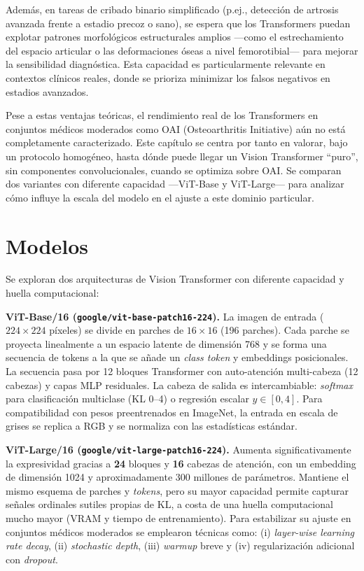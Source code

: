 \documentclass[11pt,spanish,listoffigures,listoftables]{tfgetsinf}
\begin{document}
Además, en tareas de cribado binario simplificado (p.ej., detección de artrosis avanzada frente a estadio precoz o sano), se espera que los Transformers puedan explotar patrones morfológicos estructurales amplios —como el estrechamiento del espacio articular o las deformaciones óseas a nivel femorotibial— para mejorar la sensibilidad diagnóstica. Esta capacidad es particularmente relevante en contextos clínicos reales, donde se prioriza minimizar los falsos negativos en estadios avanzados.

Pese a estas ventajas teóricas, el rendimiento real de los Transformers en conjuntos médicos moderados como OAI (Osteoarthritis Initiative) aún no está completamente caracterizado. Este capítulo se centra por tanto en valorar, bajo un protocolo homogéneo, hasta dónde puede llegar un Vision Transformer “puro”, sin componentes convolucionales, cuando se optimiza sobre OAI. Se comparan dos variantes con diferente capacidad —ViT-Base y ViT-Large— para analizar cómo influye la escala del modelo en el ajuste a este dominio particular.

\section{Modelos}
Se exploran dos arquitecturas de Vision Transformer con diferente capacidad y huella computacional:

\medskip
\noindent\textbf{ViT-Base/16 (\texttt{google/vit-base-patch16-224}).}
La imagen de entrada ($224{\times}224$ píxeles) se divide en parches de $16{\times}16$ (196 parches). Cada parche se proyecta linealmente a un espacio latente de dimensión 768 y se forma una secuencia de tokens a la que se añade un \emph{class token} y embeddings posicionales. La secuencia pasa por 12 bloques Transformer con auto-atención multi-cabeza (12 cabezas) y capas MLP residuales. La cabeza de salida es intercambiable: \emph{softmax} para clasificación multiclase (KL 0--4) o regresión escalar $\hat{y}\in[0,4]$.
Para compatibilidad con pesos preentrenados en ImageNet, la entrada en escala de grises se replica a RGB y se normaliza con las estadísticas estándar.

\medskip
\noindent\textbf{ViT-Large/16 (\texttt{google/vit-large-patch16-224}).}
Aumenta significativamente la expresividad gracias a \textbf{24} bloques y \textbf{16} cabezas de atención, con un embedding de dimensión 1024 y aproximadamente 300 millones de parámetros. Mantiene el mismo esquema de parches y \emph{tokens}, pero su mayor capacidad permite capturar señales ordinales sutiles propias de KL, a costa de una huella computacional mucho mayor (VRAM y tiempo de entrenamiento). Para estabilizar su ajuste en conjuntos médicos moderados se emplearon técnicas como: (i) \emph{layer-wise learning rate decay}, (ii) \emph{stochastic depth}, (iii) \emph{warmup} breve y (iv) regularización adicional con \emph{dropout}.
\end{document}
